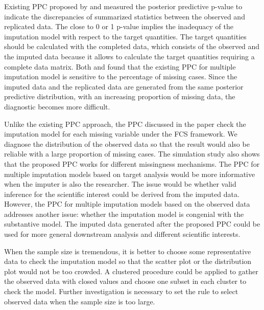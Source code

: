 	Existing PPC proposed by \citet{he2012diagnosing} and \citet{gelman2005multiple} measured the posterior predictive p-value to indicate the discrepancies of summarized statistics between the observed and replicated data. The close to 0 or 1 p-value implies the inadequacy of the imputation model with respect to the target quantities. The target quantities should be calculated with the completed data, which consists of the observed and the imputed data because it allows to calculate the target quantities requiring a complete data matrix. Both \citet{he2012diagnosing} and \citet{nguyen2015posterior} found that the existing PPC for multiple imputation model is sensitive to the percentage of missing cases. Since the imputed data and the replicated data are generated from the same posterior predictive distribution, with an increasing proportion of missing data, the diagnostic becomes more difficult.
	
	Unlike the existing PPC approach, the PPC discussed in the paper check the imputation model for each missing variable under the FCS framework. We diagnose the distribution of the observed data so that the result would also be reliable with a large proportion of missing cases. The simulation study also shows that the proposed PPC works for different missingness mechanisms. The PPC for multiple imputation models based on target analysis would be more informative when the imputer is also the researcher. The issue would be whether valid inference for the scientific interest could be derived from the imputed data. However, the PPC for multiple imputation models based on the observed data addresses another issue: whether the imputation model is congenial with the substantive model. The imputed data generated after the proposed PPC could be used for more general downstream analysis and different scientific interests.
	
	When the sample size is tremendous, it is better to choose some representative data to check the imputation model so that the scatter plot or the distribution plot would not be too crowded. A clustered procedure could be applied to gather the observed data with closed values and choose one subset in each cluster to check the model. Further investigation is necessary to set the rule to select observed data when the sample size is too large.
	
